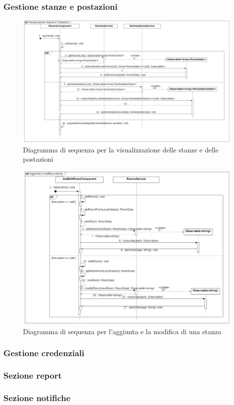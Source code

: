\subsubsection{Gestione stanze e postazioni}
\begin{figure}[H]
	\centering
	\includegraphics[width=18cm]{res/images/webapp-visualStanzePostazioni-diagrammaSequenza.png}
	\caption{Diagramma di sequenza per la visualizzazione delle stanze e delle postazioni}
	\label{fig:DiagrammaSequenzaStanzePostazioni1}
\end{figure}
\begin{figure}[H]
	\centering
	\includegraphics[width=18cm]{res/images/webapp-addEditStanzePostazioni-diagrammaSequenza.png}
	\caption{Diagramma di sequenza per l'aggiunta e la modifica di una stanza}
	\label{fig:DiagrammaSequenzaStanzePostazioni2}
\end{figure}
\subsubsection{Gestione credenziali}
\subsubsection{Sezione report}
\subsubsection{Sezione notifiche}



